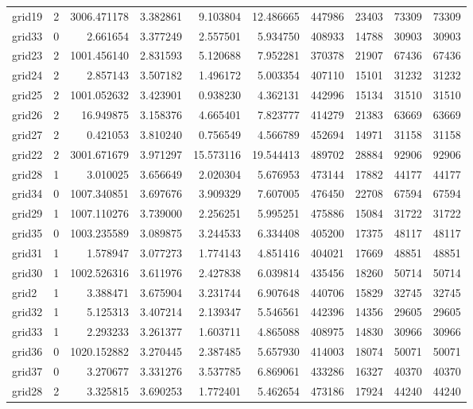 \documentclass[../../../thesis.tex]{subfiles}
\begin{document}
\begin{longtable}{|l|r|r|r|r|r|r|r|r|r|}
grid19 & 2 & 3006.471178 & 3.382861 & 9.103804 & 12.486665 & 447986 & 23403 & 73309 & 73309 \\
grid33 & 0 & 2.661654 & 3.377249 & 2.557501 & 5.934750 & 408933 & 14788 & 30903 & 30903 \\
grid23 & 2 & 1001.456140 & 2.831593 & 5.120688 & 7.952281 & 370378 & 21907 & 67436 & 67436 \\
grid24 & 2 & 2.857143 & 3.507182 & 1.496172 & 5.003354 & 407110 & 15101 & 31232 & 31232 \\
grid25 & 2 & 1001.052632 & 3.423901 & 0.938230 & 4.362131 & 442996 & 15134 & 31510 & 31510 \\
grid26 & 2 & 16.949875 & 3.158376 & 4.665401 & 7.823777 & 414279 & 21383 & 63669 & 63669 \\
grid27 & 2 & 0.421053 & 3.810240 & 0.756549 & 4.566789 & 452694 & 14971 & 31158 & 31158 \\
grid22 & 2 & 3001.671679 & 3.971297 & 15.573116 & 19.544413 & 489702 & 28884 & 92906 & 92906 \\
grid28 & 1 & 3.010025 & 3.656649 & 2.020304 & 5.676953 & 473144 & 17882 & 44177 & 44177 \\
grid34 & 0 & 1007.340851 & 3.697676 & 3.909329 & 7.607005 & 476450 & 22708 & 67594 & 67594 \\
grid29 & 1 & 1007.110276 & 3.739000 & 2.256251 & 5.995251 & 475886 & 15084 & 31722 & 31722 \\
grid35 & 0 & 1003.235589 & 3.089875 & 3.244533 & 6.334408 & 405200 & 17375 & 48117 & 48117 \\
grid31 & 1 & 1.578947 & 3.077273 & 1.774143 & 4.851416 & 404021 & 17669 & 48851 & 48851 \\
grid30 & 1 & 1002.526316 & 3.611976 & 2.427838 & 6.039814 & 435456 & 18260 & 50714 & 50714 \\
grid2 & 1 & 3.388471 & 3.675904 & 3.231744 & 6.907648 & 440706 & 15829 & 32745 & 32745 \\
grid32 & 1 & 5.125313 & 3.407214 & 2.139347 & 5.546561 & 442396 & 14356 & 29605 & 29605 \\
grid33 & 1 & 2.293233 & 3.261377 & 1.603711 & 4.865088 & 408975 & 14830 & 30966 & 30966 \\
grid36 & 0 & 1020.152882 & 3.270445 & 2.387485 & 5.657930 & 414003 & 18074 & 50071 & 50071 \\
grid37 & 0 & 3.270677 & 3.331276 & 3.537785 & 6.869061 & 433286 & 16327 & 40370 & 40370 \\
grid28 & 2 & 3.325815 & 3.690253 & 1.772401 & 5.462654 & 473186 & 17924 & 44240 & 44240 \\

\end{longtable}
\end{document}
